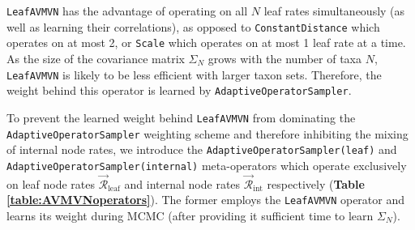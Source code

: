 \documentclass[10pt,letterpaper]{article}
\begin{document}






\texttt{LeafAVMVN} has the advantage of operating on all $N$ leaf rates simultaneously (as well as learning their correlations), as opposed to \texttt{ConstantDistance} which operates on at most 2, or \texttt{Scale} which operates on at most 1 leaf rate at a time. 
As the size of the covariance matrix $\Sigma_N$ grows with the number of taxa $N$, \texttt{LeafAVMVN} is likely to be less efficient with larger taxon sets.
Therefore, the weight behind this operator is learned by \texttt{AdaptiveOperatorSampler}.



To prevent the learned weight behind \texttt{LeafAVMVN} from dominating the \texttt{AdaptiveOperatorSampler} weighting scheme and therefore inhibiting the mixing of internal node rates, we 
introduce the \texttt{AdaptiveOperatorSampler(leaf)} and \texttt{AdaptiveOperatorSampler(internal)} meta-operators which operate exclusively on leaf node rates $\vec{\mathcal{R}}^{\,}_\text{leaf}$ and internal node rates $\vec{\mathcal{R}}^{\,}_\text{int}$ respectively  (\textbf{Table \ref{table:AVMVNoperators}}). 
The former employs the \texttt{LeafAVMVN} operator and learns its weight during MCMC (after providing it sufficient time to learn $\Sigma_N$).
\end{document}
